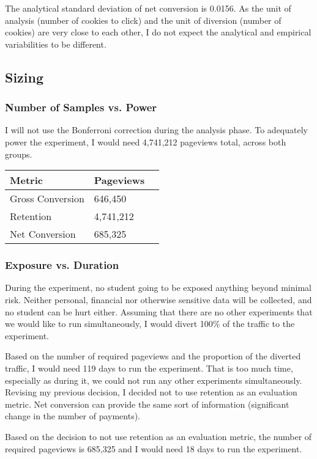 \documentclass{article}
\begin{document}
\begin{multicols}{2}
The analytical standard deviation of net conversion is 0.0156. As the unit of analysis (number of cookies to click) and the unit of diversion (number of cookies) are very close to each other, I do not expect the analytical and empirical variabilities to be different.

\subsection{Sizing}

\subsubsection{Number of Samples vs. Power}

I will not use the Bonferroni correction during the analysis phase. To adequately power the experiment, I would need 4,741,212 pageviews total, across both groups.

\vspace{1em}
\begin{tabular}{ l | l l }
Metric & Pageviews \\
\hline
Gross Conversion & 646,450 \\
Retention & 4,741,212 \\
Net Conversion & 685,325
\end{tabular}

\subsubsection{Exposure vs. Duration}

During the experiment, no student going to be exposed anything beyond minimal risk. Neither personal, financial nor otherwise sensitive data will be collected, and no student can be hurt either. Assuming that there are no other experiments that we would like to run simultaneously, I would divert 100\% of the traffic to the experiment.

Based on the number of required pageviews and the proportion of the diverted traffic, I would need 119 days to run the experiment. That is too much time, especially as during it, we could not run any other experiments simultaneously. Revising my previous decision, I decided not to use retention as an evaluation metric. Net conversion can provide the same sort of information (significant change in the number of payments).

Based on the decision to not use retention as an evaluation metric, the number of required pageviews is 685,325 and I would need 18 days to run the experiment.


\end{multicols}
\end{document}
